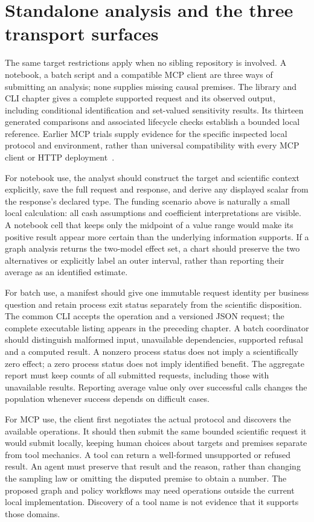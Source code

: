 \section{Standalone analysis and the three transport surfaces}

The same target restrictions apply when no sibling repository is involved.
A notebook, a batch script and a compatible MCP client are three ways of
submitting an analysis; none supplies missing causal premises. The library
and CLI chapter gives a complete supported request and its observed output,
including conditional identification and set-valued sensitivity results.
Its thirteen generated comparisons and associated lifecycle checks establish
a bounded local reference. Earlier MCP trials supply evidence for the
specific inspected local protocol and environment, rather than universal
compatibility with every MCP client or HTTP deployment~\citep{exec13_i2_examples,v12_in_runtime}.

For notebook use, the analyst should construct the target and scientific
context explicitly, save the full request and response, and derive any
displayed scalar from the response's declared type. The funding scenario
above is naturally a small local calculation: all cash assumptions and
coefficient interpretations are visible. A notebook cell that keeps only
the midpoint of a value range would make its positive result appear more
certain than the underlying information supports. If a graph analysis
returns the two-model effect set, a chart should preserve the two alternatives
or explicitly label an outer interval, rather than reporting their average
as an identified estimate.

For batch use, a manifest should give one immutable request identity per
business question and retain process exit status separately from the
scientific disposition. The common CLI accepts the operation and a versioned
JSON request; the complete executable listing appears in the preceding
chapter. A batch coordinator should distinguish malformed input, unavailable
dependencies, supported refusal and a computed result. A nonzero process
status does not imply a scientifically zero effect; a zero process status
does not imply identified benefit. The aggregate report must keep counts of
all submitted requests, including those with unavailable results. Reporting
average value only over successful calls changes the population whenever
success depends on difficult cases.

For MCP use, the client first negotiates the actual protocol and discovers
the available operations. It should then submit the same bounded scientific
request it would submit locally, keeping human choices about targets and
premises separate from tool mechanics. A tool can return a well-formed
unsupported or refused result. An agent must preserve that result and the
reason, rather than changing the sampling law or omitting the disputed
premise to obtain a number. The proposed graph and policy workflows may
need operations outside the current local implementation. Discovery of a
tool name is not evidence that it supports those domains.

